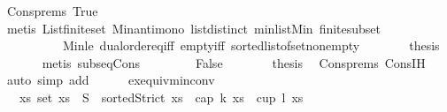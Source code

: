 \begin{isabellebody}
\ Cons{\isachardot}{\kern0pt}prems{\isacharparenleft}{\kern0pt}{}{\isacharparenright}{\kern0pt}\ True\isanewline
\ \ \ \ \ \ \isamarkupfalse%
\ {\isacharparenleft}{\kern0pt}metis\ List{\isachardot}{\kern0pt}finite{\isacharunderscore}{\kern0pt}set\ Min{\isacharunderscore}{\kern0pt}antimono\ list{\isachardot}{\kern0pt}distinct{\isacharparenleft}{\kern0pt}{}{\isacharparenright}{\kern0pt}\ min{\isacharunderscore}{\kern0pt}list{\isacharunderscore}{\kern0pt}Min\ finite{\isacharunderscore}{\kern0pt}subset\isanewline
\ \ \ \ \ \ \ \ \ \ Min{\isacharunderscore}{\kern0pt}le\ dual{\isacharunderscore}{\kern0pt}order{\isachardot}{\kern0pt}eq{\isacharunderscore}{\kern0pt}iff\ empty{\isacharunderscore}{\kern0pt}iff\ sorted{\isacharunderscore}{\kern0pt}list{\isacharunderscore}{\kern0pt}of{\isacharunderscore}{\kern0pt}set{\isacharunderscore}{\kern0pt}nonempty{\isacharparenright}{\kern0pt}\isanewline
\ \ \ \ \isamarkupfalse%
\ \isamarkupfalse%
\ {\isacharquery}{\kern0pt}thesis\ \isamarkupfalse%
\ {}\ {}\ {}\ {}\ \isamarkupfalse%
\ {\isacharparenleft}{\kern0pt}metis\ subseq{\isacharunderscore}{\kern0pt}Cons{}{\isacharparenright}{\kern0pt}\isanewline
\ \ \isamarkupfalse%
\isanewline
\ \ \ \ \isamarkupfalse%
\ False\isanewline
\ \ \ \ \isamarkupfalse%
\ \isamarkupfalse%
\ {\isacharquery}{\kern0pt}thesis\ \isamarkupfalse%
\ Cons{\isachardot}{\kern0pt}prems{\isacharparenleft}{\kern0pt}{}{\isacharparenright}{\kern0pt}\ Cons{\isachardot}{\kern0pt}IH\ \isamarkupfalse%
\ {\isacharparenleft}{\kern0pt}auto\ simp\ add{\isacharcolon}{\kern0pt}\ {}\ {}{\isacharparenright}{\kern0pt}\isanewline
\ \ \isamarkupfalse%
\isanewline
{}\isamarkupfalse%
%
\endisatagproof
{\isafoldproof}%
%
\isadelimproof
\isanewline
%
\endisadelimproof
\isanewline
\isanewline
\isanewline
{}\isamarkupfalse%
\ ex{\isacharunderscore}{\kern0pt}equiv{\isacharunderscore}{\kern0pt}minconv{\isacharcolon}{\kern0pt}\isanewline
\ \ {\isachardoublequoteopen}\ {\isacharparenleft}{\kern0pt}{\isasymexists}xs{\isachardot}{\kern0pt}\ set\ xs\ {\isasymsubseteq}\ S\ {\isasymand}\ {\isacharparenleft}{\kern0pt}sortedStrict\ xs{\isacharparenright}{\kern0pt}\ {\isasymand}\ {\isacharparenleft}{\kern0pt}cap\ k\ xs\ {\isasymor}\ cup\ l\ xs{\isacharparenright}{\kern0pt}{\isacharparenright}{\kern0pt}\ {\isasymlongrightarrow}\isanewline

\end{isabellebody}
